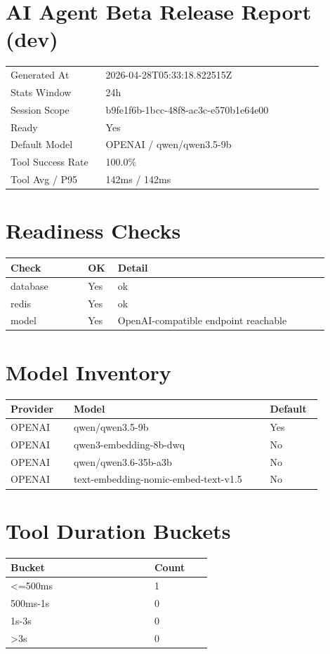 \documentclass[11pt]{article}
\begin{document}
\section*{AI Agent Beta Release Report (dev)}
\begin{tabular}{p{0.28\linewidth} p{0.64\linewidth}}
Generated At & 2026-04-28T05:33:18.822515Z \\
Stats Window & 24h \\
Session Scope & b9fe1f6b-1bcc-48f8-ac3c-e570b1e64e00 \\
Ready & Yes \\
Default Model & OPENAI / qwen/qwen3.5-9b \\
Tool Success Rate & 100.0\% \\
Tool Avg / P95 & 142ms / 142ms \\
\end{tabular}

\section*{Readiness Checks}
\begin{longtable}{p{0.22\linewidth} p{0.08\linewidth} p{0.60\linewidth}}
\toprule
Check & OK & Detail \\
\midrule
\endhead
database & Yes & ok \\
redis & Yes & ok \\
model & Yes & OpenAI-compatible endpoint reachable \\
\bottomrule
\end{longtable}

\section*{Model Inventory}
\begin{longtable}{p{0.18\linewidth} p{0.56\linewidth} p{0.14\linewidth}}
\toprule
Provider & Model & Default \\
\midrule
\endhead
OPENAI & qwen/qwen3.5-9b & Yes \\
OPENAI & qwen3-embedding-8b-dwq & No \\
OPENAI & qwen/qwen3.6-35b-a3b & No \\
OPENAI & text-embedding-nomic-embed-text-v1.5 & No \\
\bottomrule
\end{longtable}

\section*{Tool Duration Buckets}
\begin{longtable}{p{0.50\linewidth} p{0.20\linewidth}}
\toprule
Bucket & Count \\
\midrule
\endhead
<=500ms & 1 \\
500ms-1s & 0 \\
1s-3s & 0 \\
>3s & 0 \\
\bottomrule
\end{longtable}
\end{document}

